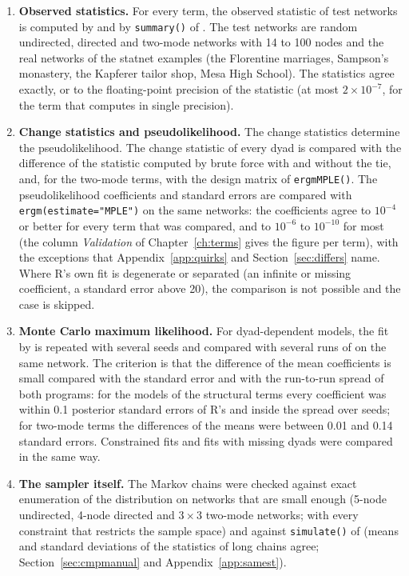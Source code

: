 \begin{enumerate}[nosep]
  \item \textbf{Observed statistics.} For every term, the observed statistic of test networks is computed by \nwergm{} and by \texttt{summary()} of \ergm{}. The test networks are random undirected, directed and two-mode networks with 14 to 100 nodes and the real networks of the statnet examples (the Florentine marriages, Sampson's monastery, the Kapferer tailor shop, Mesa High School). The statistics agree exactly, or to the floating-point precision of the statistic (at most $2\times10^{-7}$, for the term that \ergm{} computes in single precision).
  \item \textbf{Change statistics and pseudolikelihood.} The change statistics determine the pseudolikelihood. The change statistic of every dyad is compared with the difference of the statistic computed by brute force with and without the tie, and, for the two-mode terms, with the design matrix of \texttt{ergmMPLE()}. The pseudolikelihood coefficients and standard errors are compared with \texttt{ergm(estimate="MPLE")} on the same networks: the coefficients agree to $10^{-4}$ or better for every term that was compared, and to $10^{-6}$ to $10^{-10}$ for most (the column \emph{Validation} of Chapter~\ref{ch:terms} gives the figure per term), with the exceptions that Appendix~\ref{app:quirks} and Section~\ref{sec:differs} name. Where R's own fit is degenerate or separated (an infinite or missing coefficient, a standard error above 20), the comparison is not possible and the case is skipped.
  \item \textbf{Monte Carlo maximum likelihood.} For dyad-dependent models, the fit by \nwergm{} is repeated with several seeds and compared with several runs of \ergm{} on the same network. The criterion is that the difference of the mean coefficients is small compared with the standard error and with the run-to-run spread of both programs: for the models of the structural terms every coefficient was within 0.1 posterior standard errors of R's and inside the spread over seeds; for two-mode terms the differences of the means were between 0.01 and 0.14 standard errors. Constrained fits and fits with missing dyads were compared in the same way.
  \item \textbf{The sampler itself.} The Markov chains were checked against exact enumeration of the distribution on networks that are small enough (5-node undirected, 4-node directed and $3\times3$ two-mode networks; with every constraint that restricts the sample space) and against \texttt{simulate()} of \ergm{} (means and standard deviations of the statistics of long chains agree; Section~\ref{sec:cmpmanual} and Appendix~\ref{app:samest}).
\end{enumerate}
